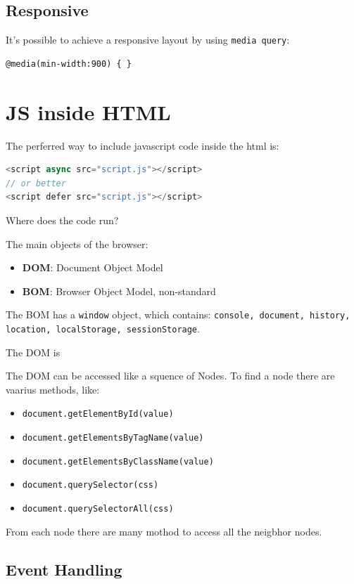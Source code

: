 \documentclass[12pt]{article}
\begin{document}
\subsection{Responsive}
It's possible to achieve a responsive layout by using \texttt{media query}:
\begin{lstlisting}[language=html]
@media(min-width:900) { }
\end{lstlisting}


\section{JS inside HTML}
The perferred way to include javascript code inside the html is:
\begin{lstlisting}[language=js]
<script async src="script.js"></script>
// or better
<script defer src="script.js"></script>
\end{lstlisting}
Where does the code run?


The main objects of the browser:
\begin{itemize}
  \item \textbf{DOM}: Document Object Model 
  \item \textbf{BOM}: Browser Object Model, non-standard
\end{itemize}
The BOM has a \texttt{window} object, which contains: \texttt{console, document, history, location, localStorage, sessionStorage}.

The DOM is 

The DOM can be accessed like a squence of Nodes. To find a node there are vaarius methods, like:
\begin{itemize}
  \item \texttt{document.getElementById(value)}
  \item \texttt{document.getElementsByTagName(value)}
  \item \texttt{document.getElementsByClassName(value)}
  \item \texttt{document.querySelector(css)}
  \item \texttt{document.querySelectorAll(css)}
\end{itemize}
From each node there are many mothod to access all the neigbhor nodes.




\subsection{Event Handling}
\end{document}
